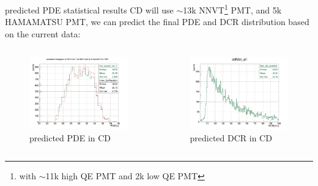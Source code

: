 \begin{frame}{predicted PDE statistical results}
CD will use $\sim$13k NNVT\footnote{with $\sim$11k high QE PMT and 2k low QE PMT} PMT, and 5k HAMAMATSU PMT, we can predict the final PDE and DCR distribution based on the current data:
\begin{columns}
\begin{column}{.5\textwidth}
\begin{figure}
\centering
\includegraphics[width=\textwidth]{figures/sim.png} %
\caption{predicted PDE in CD}
\end{figure}
\end{column}
\begin{column}{.5\textwidth}
\begin{figure}
\centering
\includegraphics[width=\textwidth]{figures/dcr_p.png} %
\caption{predicted DCR in CD}
\end{figure}
\end{column}
\end{columns}
\end{frame}

